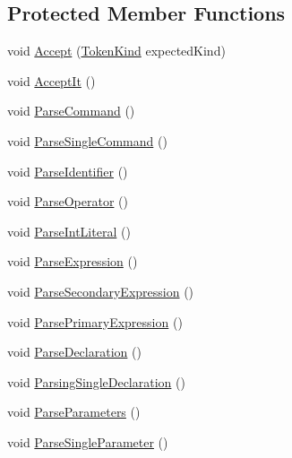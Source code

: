 \subsection*{Protected Member Functions}
\begin{DoxyCompactItemize}
\item 
void \mbox{\hyperlink{class_compiler_1_1_parser_aaedaac51ec193dd68541fd9d39fddde8}{Accept}} (\mbox{\hyperlink{namespace_compiler_a57929962f25004759596fc3f13cf563c}{Token\+Kind}} expected\+Kind)
\item 
void \mbox{\hyperlink{class_compiler_1_1_parser_ae19e507e1e2460cbad35b03d24402b4f}{Accept\+It}} ()
\item 
void \mbox{\hyperlink{class_compiler_1_1_parser_a7ab30d3d783ccf064784df2df654ea76}{Parse\+Command}} ()
\item 
void \mbox{\hyperlink{class_compiler_1_1_parser_af315f582be84f8e1b37add91efa3afc0}{Parse\+Single\+Command}} ()
\item 
void \mbox{\hyperlink{class_compiler_1_1_parser_af099ac84308e83bf30b3dfd6dc51bd32}{Parse\+Identifier}} ()
\item 
void \mbox{\hyperlink{class_compiler_1_1_parser_ae03983db321bc672df2b8400f03eb67e}{Parse\+Operator}} ()
\item 
void \mbox{\hyperlink{class_compiler_1_1_parser_a052fa556c8a6b8a8d677a1faaa3342db}{Parse\+Int\+Literal}} ()
\item 
void \mbox{\hyperlink{class_compiler_1_1_parser_a8c6c2073d17ac572fb9117892cbf5aa1}{Parse\+Expression}} ()
\item 
void \mbox{\hyperlink{class_compiler_1_1_parser_a2c35615302bb055e4e720b94e5020a59}{Parse\+Secondary\+Expression}} ()
\item 
void \mbox{\hyperlink{class_compiler_1_1_parser_a9ce17cf1f3fa7062daf05481f3230330}{Parse\+Primary\+Expression}} ()
\item 
void \mbox{\hyperlink{class_compiler_1_1_parser_ab9718b82a785e63b848e51c39bbe8ee7}{Parse\+Declaration}} ()
\item 
void \mbox{\hyperlink{class_compiler_1_1_parser_ad0b467a2202c311d465a11165f602216}{Parsing\+Single\+Declaration}} ()
\item 
void \mbox{\hyperlink{class_compiler_1_1_parser_a80fd5f767a44bd3110cfbd4ee47a15dd}{Parse\+Parameters}} ()
\item 
void \mbox{\hyperlink{class_compiler_1_1_parser_a8d8a8adab2a324a07947c147df0d250f}{Parse\+Single\+Parameter}} ()
\end{DoxyCompactItemize}

